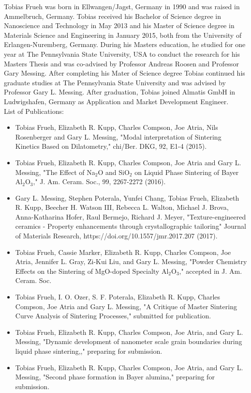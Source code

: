 \vspace*{-2mm}
Tobias Frueh was born in Ellwangen/Jagst, Germany in 1990 and was raised in Ammelbruch, Germany. Tobias received his Bachelor of Science degree in Nanoscience and Technology in May 2013 and his Master of Science degree in Materials Science and Engineering in January 2015, both from the University of Erlangen-Nuremberg, Germany. During his Masters education, he studied for one year at The Pennsylvania State University, USA to conduct the research for his Masters Thesis and was co-advised by Professor Andreas Roosen and Professor Gary Messing. After completing his Mater of Science degree Tobias continued his graduate studies at The Pennsylvania State University and was advised by Professor Gary L. Messing. After graduation, Tobias joined Almatis GmbH in Ludwigshafen, Germany as Application and Market Development Engineer.
\\
\newline
\noindent List of Publications:
\begin{itemize}
	\item Tobias Frueh, Elizabeth R. Kupp, Charles Compson, Joe Atria, Nils Rosenberger and Gary L. Messing, "Modal interpretation of Sintering Kinetics Based on Dilatometry," chi/Ber. DKG, 92, E1-4 (2015). 
	\item Tobias Frueh, Elizabeth R. Kupp, Charles Compson, Joe Atria and Gary L. Messing, "The Effect of Na$_{2}$O and SiO$_{2}$ on Liquid Phase Sintering of Bayer Al$_{2}$O$_{3}$," J. Am. Ceram. Soc., 99, 2267-2272 (2016).
	\item Gary L. Messing, Stephen Poterala, Yunfei Chang, Tobias Frueh, Elizabeth R. Kupp, Beecher H. Watson III, Rebecca L. Walton, Michael J. Brova, Anna-Katharina Hofer, Raul Bermejo, Richard J. Meyer, "Texture-engineered ceramics - Property enhancements through crystallographic tailoring" Journal of Materials Research, https://doi.org/10.1557/jmr.2017.207 (2017).
	\item Tobias Frueh, Cassie Marker, Elizabeth R. Kupp, Charles Compson, Joe Atria, Jennifer L. Gray, Zi-Kui Liu, and Gary L. Messing, "Powder Chemistry Effects on the Sintering of MgO-doped Specialty Al$_{2}$O$_{3}$," accepted in J. Am. Ceram. Soc.
	\item Tobias Frueh, I. O. Ozer, S. F. Poterala, Elizabeth R. Kupp, Charles Compson, Joe Atria and Gary L. Messing, "A Critique of Master Sintering Curve Analysis of Sintering Processes," submitted for publication.
	\item Tobias Frueh, Elizabeth R. Kupp, Charles Compson, Joe Atria, and Gary L. Messing, "Dynamic development of nanometer scale grain boundaries during liquid phase sintering,," preparing for submission.
	\item Tobias Frueh, Elizabeth R. Kupp, Charles Compson, Joe Atria, and Gary L. Messing, "Second phase formation in Bayer alumina," preparing for submission.
\end{itemize}